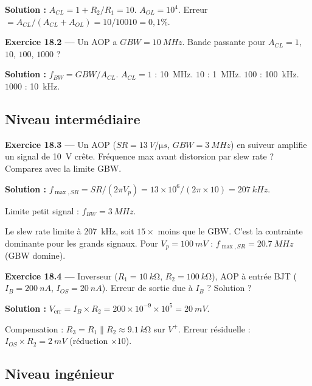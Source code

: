 \documentclass[12pt,a4paper,twoside]{book}
\begin{document}
\begin{pratique}
\textbf{Solution :} $A_{CL} = 1 + R_2/R_1 = 10$. $A_{OL} = 10^4$. Erreur $= A_{CL}/(A_{CL}+A_{OL}) = 10/10010 = 0{,}1\%$.
\end{pratique}

\textbf{Exercice 18.2 ---} Un AOP a $GBW = \SI{10}{MHz}$. Bande passante pour $A_{CL} = 1$, $10$, $100$, $1000$ ?

\begin{pratique}
\textbf{Solution :} $f_{BW} = GBW/A_{CL}$. $A_{CL} = 1$ : \SI{10}{MHz}. $10$ : \SI{1}{MHz}. $100$ : \SI{100}{kHz}. $1000$ : \SI{10}{kHz}.
\end{pratique}

\subsection*{Niveau intermédiaire}

\textbf{Exercice 18.3 ---} Un AOP ($SR = \SI{13}{V/\micro s}$, $GBW = \SI{3}{MHz}$) en suiveur amplifie un signal de \SI{10}{V} crête. Fréquence max avant distorsion par slew rate ? Comparez avec la limite GBW.

\begin{pratique}
\textbf{Solution :} $f_{\max,SR} = SR/(2\pi V_p) = 13\times10^6/(2\pi\times10) = \SI{207}{kHz}$.

Limite petit signal : $f_{BW} = \SI{3}{MHz}$.

Le slew rate limite à \SI{207}{kHz}, soit $15\times$ moins que le GBW. C'est la contrainte dominante pour les grands signaux. Pour $V_p = \SI{100}{mV}$ : $f_{\max,SR} = \SI{20.7}{MHz}$ (GBW domine).
\end{pratique}

\textbf{Exercice 18.4 ---} Inverseur ($R_1 = \SI{10}{k\ohm}$, $R_2 = \SI{100}{k\ohm}$), AOP à entrée BJT ($I_B = \SI{200}{nA}$, $I_{OS} = \SI{20}{nA}$). Erreur de sortie due à $I_B$ ? Solution ?

\begin{pratique}
\textbf{Solution :} $V_{\text{err}} = I_B \times R_2 = 200\times10^{-9}\times10^5 = \SI{20}{mV}$.

Compensation : $R_3 = R_1 \parallel R_2 \approx \SI{9.1}{k\ohm}$ sur $V^+$. Erreur résiduelle : $I_{OS} \times R_2 = \SI{2}{mV}$ (réduction $\times 10$).
\end{pratique}

\subsection*{Niveau ingénieur}
\end{document}
